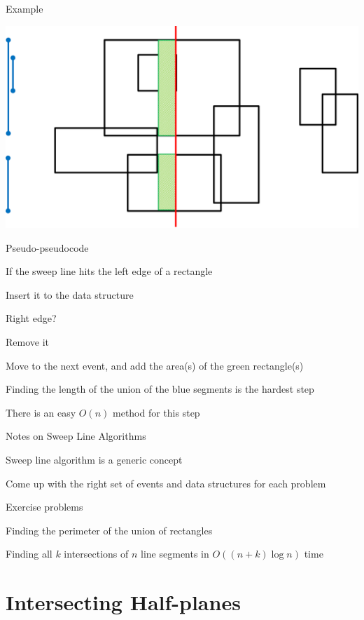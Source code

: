 \documentclass[13pt,onlymath]{beamer}
\begin{document}
\begin{frame}{Example}
\begin{center}
\includegraphics[height=0.6\textheight]{figures/sweep11}
\end{center}
\end{frame}

\begin{frame}{Pseudo-pseudocode}
\BIT
\item If the sweep line hits the left edge of a rectangle
\BIT
\item Insert it to the data structure
\EIT
\item Right edge?
\BIT
\item Remove it
\EIT
\item Move to the next event, and add the area(s) of the green rectangle(s)
\BIT
\item Finding the length of the union of the blue segments is the hardest step
\item There is an easy $O(n)$ method for this step
\EIT
\EIT
\end{frame}

\begin{frame}{Notes on Sweep Line Algorithms}
\BIT
\item Sweep line algorithm is a generic concept
\BIT
\item Come up with the right set of events and data structures for each problem
\EIT
\item Exercise problems
\BIT
\item Finding the perimeter of the union of rectangles
\item Finding all $k$ intersections of $n$ line segments in $O((n+k) \log n)$ time
\EIT\EIT
\end{frame}

\section{Intersecting Half-planes}
\end{document}
